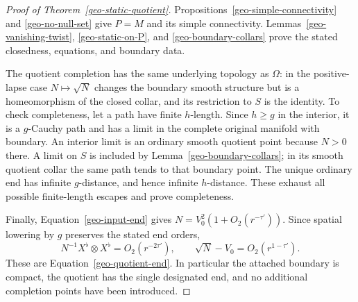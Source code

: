 \begin{proof}[Proof of Theorem~\ref{geo-static-quotient}]
Propositions~\ref{geo-simple-connectivity} and \ref{geo-no-null-set} give
$P=M$ and its simple connectivity.  Lemmas~\ref{geo-vanishing-twist},
\ref{geo-static-on-P}, and \ref{geo-boundary-collars} prove the stated
closedness, equations, and boundary data.

The quotient completion has the same underlying topology as $\Omega$:
in the positive-lapse case $N\mapsto\sqrt N$ changes the boundary smooth
structure but is a homeomorphism of the closed collar, and its restriction
to $S$ is the identity.  To check completeness, let a path have finite
$h$-length.  Since $h\geq g$ in the interior, it is a $g$-Cauchy path and
has a limit in the complete original manifold with boundary.  An interior
limit is an ordinary smooth quotient point because $N>0$ there.  A limit
on $S$ is included by Lemma~\ref{geo-boundary-collars}; in its smooth
quotient collar the same path tends to that boundary point.  The unique
ordinary end has infinite $g$-distance, and hence infinite $h$-distance.
These exhaust all possible finite-length escapes and prove completeness.

Finally, Equation~\eqref{geo-input-end} gives
$N=V_0^2(1+O_2(r^{-\tau'}))$.  Since spatial lowering by $g$ preserves the
stated end orders,
\[
 N^{-1}X^\flat\otimes X^\flat=O_2(r^{-2\tau'}),
 \qquad \sqrt N-V_0=O_2(r^{1-\tau'}).
\]
These are Equation~\eqref{geo-quotient-end}.  In particular the attached
boundary is compact, the quotient has the single designated end, and no
additional completion points have been introduced.
\end{proof}
